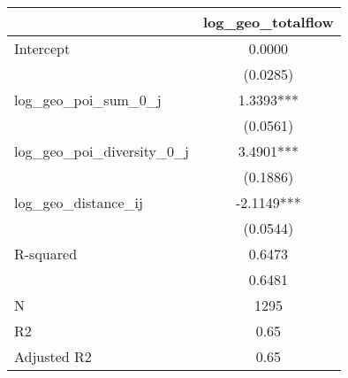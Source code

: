 \begin{table}
\caption{}
\begin{center}
\begin{tabular}{lc}
\hline
                               & log\_geo\_totalflow  \\
\midrule
Intercept                      & 0.0000               \\
                               & (0.0285)             \\
log\_geo\_poi\_sum\_0\_j       & 1.3393***            \\
                               & (0.0561)             \\
log\_geo\_poi\_diversity\_0\_j & 3.4901***            \\
                               & (0.1886)             \\
log\_geo\_distance\_ij         & -2.1149***           \\
                               & (0.0544)             \\
R-squared                      & 0.6473               \\
                               & 0.6481               \\
N                              & 1295                 \\
R2                             & 0.65                 \\
Adjusted R2                    & 0.65                 \\
\hline
\end{tabular}
\end{center}
\end{table}